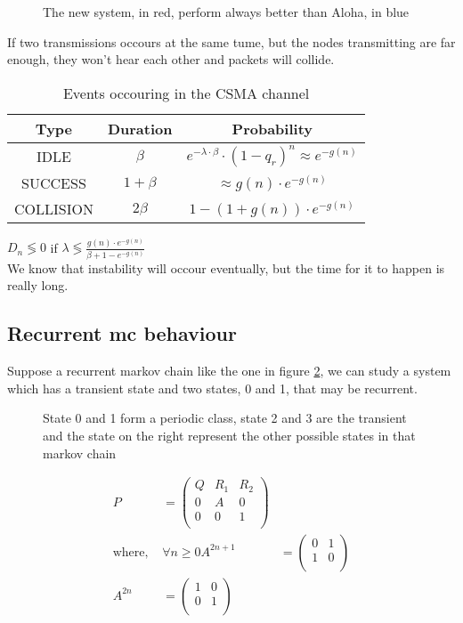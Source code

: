 \begin{figure} \centering
  
  \caption{The new system, in red, perform always better than Aloha, in blue}
  \label{}
\end{figure}
If two transmissions occours at the same tume, but the nodes transmitting are far
 enough, they won't hear each other and packets will collide.
 \begin{table}[h!]
\centering
\begin{tabular}{|c|c|c|}
\textbf{Type} & \textbf{Duration} & \textbf{Probability}                                         \\ \hline
IDLE          & $\beta$           & $e^{-\lambda \cdot \beta} \cdot (1-q_r)^n \approx e^{-g(n)}$ \\
SUCCESS       & $1+\beta$         & $\approx g(n) \cdot e^{-g(n)}$                               \\
COLLISION     & $2 \beta$         & $1-(1+g(n))\cdot e^{-g(n)}$
\end{tabular}
\caption{Events occouring in the CSMA channel}
\label{TAB:tx_prob}
\end{table}
$D_n \lessgtr 0 $ if $\lambda \lessgtr \frac{g(n) \cdot e^{-g(n)}}{\beta + 1 - e^{-g(n)}}$\\
We know that instability will occour eventually, but the time for it to happen is really long.

\subsection{Recurrent \gls{mc} behaviour}
Suppose a recurrent markov chain like the one in figure \ref{fig:recurrMC}, we can study a system which has a transient state and two states, 0 and 1,
that may be recurrent.
\begin{figure}[h!]\centering
  
  \caption{ State 0 and 1 form a periodic class, state 2 and 3 are the transient
  and the state on the right represent the other possible states in that markov chain}
  \label{fig:recurrMC}
\end{figure}

\begin{equation}\begin{split}
  P&=\begin{pmatrix}
      Q & R_1 & R_2 \\
      0 & A   & 0 \\
      0 & 0   & 1 \\
  \end{pmatrix}\\
  \text{where, }&\forall n\ge 0
  A^{2n+1}&=\begin{pmatrix}
      0 & 1 \\
      1 & 0 \\
  \end{pmatrix}\\
  A^{2n}&=\begin{pmatrix}
      1 & 0 \\
      0 & 1 \\
  \end{pmatrix}\\
\end{split}\end{equation}

